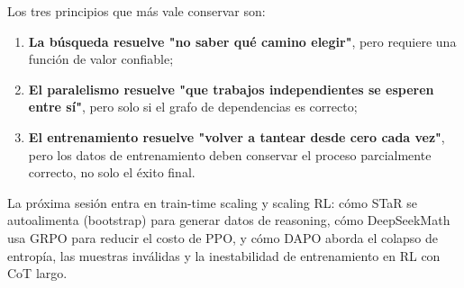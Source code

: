 \documentclass[a4paper]{article}
\begin{document}
Los tres principios que más vale conservar son:

\begin{enumerate}
    \item \textbf{La búsqueda resuelve "no saber qué camino elegir"}, pero requiere una función de valor confiable;
    \item \textbf{El paralelismo resuelve "que trabajos independientes se esperen entre sí"}, pero solo si el grafo de dependencias es correcto;
    \item \textbf{El entrenamiento resuelve "volver a tantear desde cero cada vez"}, pero los datos de entrenamiento deben conservar el proceso parcialmente correcto, no solo el éxito final.
\end{enumerate}

La próxima sesión entra en train-time scaling y scaling RL: cómo STaR se autoalimenta (bootstrap) para generar datos de reasoning, cómo DeepSeekMath usa GRPO para reducir el costo de PPO, y cómo DAPO aborda el colapso de entropía, las muestras inválidas y la inestabilidad de entrenamiento en RL con CoT largo.
\end{document}
